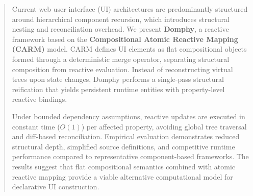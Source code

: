 \begin{abstract}
Current web user interface (UI) architectures are predominantly structured around hierarchical component recursion, which introduces structural nesting and reconciliation overhead. We present \textbf{Domphy}, a reactive framework based on the \textbf{Compositional Atomic Reactive Mapping (CARM)} model. CARM defines UI elements as flat compositional objects formed through a deterministic merge operator, separating structural composition from reactive evaluation. Instead of reconstructing virtual trees upon state changes, Domphy performs a single-pass structural reification that yields persistent runtime entities with property-level reactive bindings. 

Under bounded dependency assumptions, reactive updates are executed in constant time ($O(1)$) per affected property, avoiding global tree traversal and diff-based reconciliation. Empirical evaluation demonstrates reduced structural depth, simplified source definitions, and competitive runtime performance compared to representative component-based frameworks. The results suggest that flat compositional semantics combined with atomic reactive mapping provide a viable alternative computational model for declarative UI construction.
\end{abstract}
